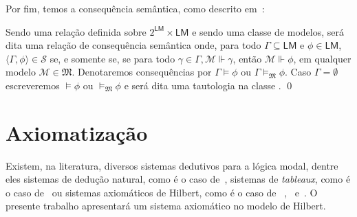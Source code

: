         Por fim, temos a consequência semântica, como descrito em~:

        \begin{definicao}
            Sendo  uma relação definida sobre \(2^{\mathsf{LM}} \times \mathsf{LM}\) e sendo  uma classe de modelos,
             será dita uma relação de consequência semântica onde, para todo \(\Gamma \subseteq \mathsf{LM}\) e \(\phi \in \mathsf{LM}\),
            \(\langle \Gamma, \phi \rangle \in \mathord{\mathcal{S}}\) se, e somente se,
            se para todo \(\gamma \in \Gamma, \mathcal{M} \Vdash \gamma\), então \(\mathcal{M} \Vdash \phi\), em qualquer modelo \(\mathcal{M} \in \mathfrak{M}\).
            Denotaremos consequências por \(\Gamma \vDash \phi\) ou \(\Gamma \vDash_{\mathfrak{M}} \phi\).
            Caso \(\Gamma = \emptyset\) escreveremos \(\vDash \phi\) ou \(\vDash_{\mathfrak{M}} \phi\) e \PHI será dita uma tautologia na classe . \qed
        \end{definicao}


    \section{Axiomatização}
        \label{sec:LM-Axiomatizacao}
        Existem, na literatura, diversos sistemas dedutivos para a lógica modal, dentre eles sistemas de dedução natural, como é o caso de~,
        sistemas de \textit{tableaux}, como é o caso de~ ou sistemas axiomáticos de Hilbert, como é o caso de
        ~,~ e~. O presente trabalho apresentará um sistema axiomático no modelo de Hilbert.

